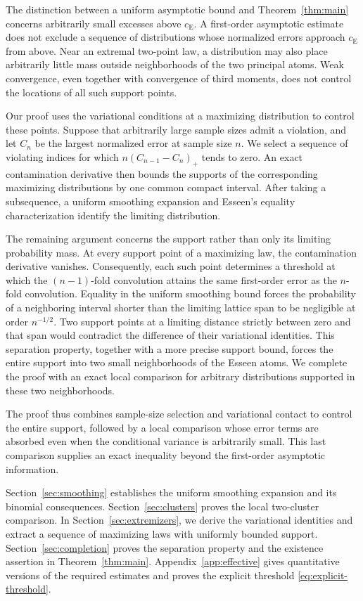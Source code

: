 \documentclass[aop]{imsart}
\theoremstyle{plain}
\theoremstyle{definition}
\theoremstyle{definition}
\newcommand{\ce}{c_{\mathrm E}}
\begin{document}
The distinction between a uniform asymptotic bound and Theorem~\ref{thm:main} concerns arbitrarily small excesses above \(\ce\). A first-order asymptotic estimate does not exclude a sequence of distributions whose normalized errors approach \(\ce\) from above. Near an extremal two-point law, a distribution may also place arbitrarily little mass outside neighborhoods of the two principal atoms. Weak convergence, even together with convergence of third moments, does not control the locations of all such support points.

Our proof uses the variational conditions at a maximizing distribution to control these points. Suppose that arbitrarily large sample sizes admit a violation, and let \(C_n\) be the largest normalized error at sample size \(n\). We select a sequence of violating indices for which \(n(C_{n-1}-C_n)_+\) tends to zero. An exact contamination derivative then bounds the supports of the corresponding maximizing distributions by one common compact interval. After taking a subsequence, a uniform smoothing expansion and Esseen's equality characterization identify the limiting distribution.

The remaining argument concerns the support rather than only its limiting probability mass. At every support point of a maximizing law, the contamination derivative vanishes. Consequently, each such point determines a threshold at which the \((n-1)\)-fold convolution attains the same first-order error as the \(n\)-fold convolution. Equality in the uniform smoothing bound forces the probability of a neighboring interval shorter than the limiting lattice span to be negligible at order \(n^{-1/2}\). Two support points at a limiting distance strictly between zero and that span would contradict the difference of their variational identities. This separation property, together with a more precise support bound, forces the entire support into two small neighborhoods of the Esseen atoms. We complete the proof with an exact local comparison for arbitrary distributions supported in these two neighborhoods.

The proof thus combines sample-size selection and variational contact to control the entire support, followed by a local comparison whose error terms are absorbed even when the conditional variance is arbitrarily small. This last comparison supplies an exact inequality beyond the first-order asymptotic information.

Section~\ref{sec:smoothing} establishes the uniform smoothing expansion and its binomial consequences. Section~\ref{sec:clusters} proves the local two-cluster comparison. In Section~\ref{sec:extremizers}, we derive the variational identities and extract a sequence of maximizing laws with uniformly bounded support. Section~\ref{sec:completion} proves the separation property and the existence assertion in Theorem~\ref{thm:main}. Appendix~\ref{app:effective} gives quantitative versions of the required estimates and proves the explicit threshold \eqref{eq:explicit-threshold}.
\end{document}
